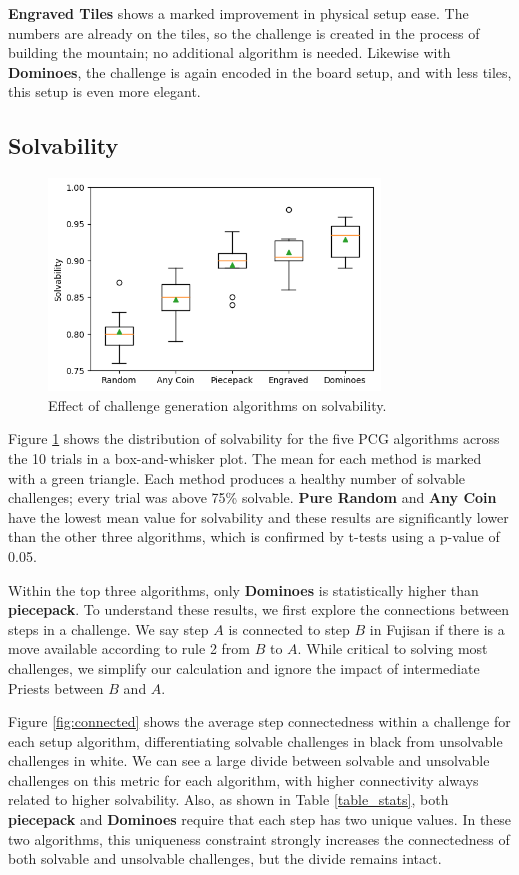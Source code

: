\documentclass[10pt,journal,compsoc]{IEEEtran}
\begin{document}
{\bf Engraved Tiles} shows a marked improvement in physical setup ease.
The numbers are already on the tiles, so the challenge is created in the process of building the mountain; no additional algorithm is needed. Likewise with {\bf Dominoes}, the challenge is again encoded in the board setup, and with less tiles, this setup is even more elegant.

\subsection{Solvability}

\begin{figure}[t]
\includegraphics[width=8.8cm]{graphics/standalonesolve.png}
\caption{Effect of challenge generation algorithms on solvability.}
\label{fig:strategycomp}
\end{figure}

Figure \ref{fig:strategycomp} shows the distribution of solvability for the five PCG algorithms across the 10 trials in a box-and-whisker plot. The mean for each method is marked with a green triangle. Each method produces a healthy number of solvable challenges; every trial was above 75\% solvable. {\bf Pure Random} and {\bf Any Coin} have the lowest mean value for solvability and these results are significantly lower than the other three algorithms, which is confirmed by t-tests using a p-value of 0.05. 

Within the top three algorithms, only {\bf Dominoes} is statistically higher than {\bf piecepack}. To understand these results, we first explore the connections between steps in a challenge. We say step $A$ is connected to step $B$ in Fujisan if there is a move available according to rule 2 from $B$ to $A$. While critical to solving most challenges, we simplify our calculation and ignore the impact of intermediate Priests between $B$ and $A$. 

Figure \ref{fig:connected} shows the average step connectedness within a challenge for each setup algorithm, differentiating solvable challenges in black from unsolvable challenges in white. We can see a large divide between solvable and unsolvable challenges on this metric for each algorithm, with higher connectivity always related to higher solvability. Also, as shown in Table \ref{table_stats}, both {\bf piecepack} and {\bf Dominoes} require that each step has two unique values. In these two algorithms, this uniqueness constraint strongly increases the connectedness of both solvable and unsolvable challenges, but the divide remains intact.
\end{document}
